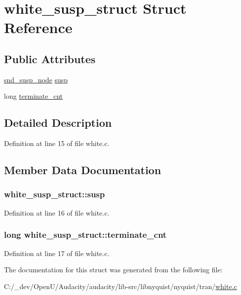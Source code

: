 \hypertarget{structwhite__susp__struct}{}\section{white\+\_\+susp\+\_\+struct Struct Reference}
\label{structwhite__susp__struct}
\subsection*{Public Attributes}
\begin{DoxyCompactItemize}
\item 
\hyperlink{sound_8h_a6b268203688a934bd798ceb55f85d4c0}{snd\+\_\+susp\+\_\+node} \hyperlink{structwhite__susp__struct_a45b3b1b6a922767b38f015692e3ac470}{susp}
\item 
long \hyperlink{structwhite__susp__struct_a4e4ca94e926fe4c5b7af6915e7b40f3d}{terminate\+\_\+cnt}
\end{DoxyCompactItemize}


\subsection{Detailed Description}


Definition at line 15 of file white.\+c.



\subsection{Member Data Documentation}
\subsubsection[{\texorpdfstring{susp}{susp}}]{ white\+\_\+susp\+\_\+struct\+::susp}\hypertarget{structwhite__susp__struct_a45b3b1b6a922767b38f015692e3ac470}{}\label{structwhite__susp__struct_a45b3b1b6a922767b38f015692e3ac470}


Definition at line 16 of file white.\+c.

\subsubsection[{\texorpdfstring{terminate\+\_\+cnt}{terminate_cnt}}]{\setlength{\rightskip}{0pt plus 5cm}long white\+\_\+susp\+\_\+struct\+::terminate\+\_\+cnt}\hypertarget{structwhite__susp__struct_a4e4ca94e926fe4c5b7af6915e7b40f3d}{}\label{structwhite__susp__struct_a4e4ca94e926fe4c5b7af6915e7b40f3d}


Definition at line 17 of file white.\+c.



The documentation for this struct was generated from the following file\+:\begin{DoxyCompactItemize}
\item 
C\+:/\+\_\+dev/\+Open\+U/\+Audacity/audacity/lib-\/src/libnyquist/nyquist/tran/\hyperlink{white_8c}{white.\+c}\end{DoxyCompactItemize}
